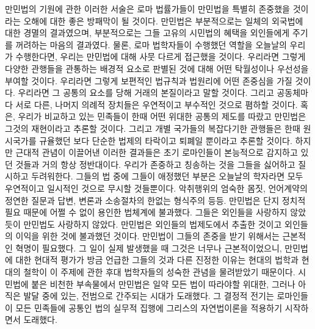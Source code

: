 만민법의 기원에 관한 이러한 서술은
로마 법률가들이 만민법을 특별히 존중했을 것이라는 오해에 대한
좋은 방패막이 될 것이다.
만민법은 부분적으로는 일체의 외국법에 대한 경멸의 결과였으며,
부분적으로는 그들 고유의 시민법의 혜택을 외인들에게 주기를 꺼려하는
마음의 결과였다.
물론, 로마 법학자들이 수행했던 역할을 오늘날의 우리가 수행한다면,
우리는 만민법에 대해 사뭇 다르게 접근했을 것이다.
우리라면 그렇게 다양한 관행들을 관통하는 배경적 요소로 판별된 것에 대해
어떤 탁월성이나 우선성을 부여할 것이다.
우리라면 그렇게 보편적인 법규칙과 법원리에 어떤 존중심을 가질 것이다.
우리라면 그 공통의 요소를 당해 거래의 본질이라고 말할 것이다.
그리고 공동체마다 서로 다른, 나머지 의례적 장치들은
우연적이고 부수적인 것으로 폄하할 것이다.
혹은, 우리가 비교하고 있는 민족들이 한때 어떤 위대한 공통의 제도를
따랐고 만민법은 그것의 재현이라고 추론할 것이다.
그리고 개별 국가들의 복잡다기한 관행들은 한때 원시국가를 규율했던
보다 단순한 법제의 타락이고 퇴폐일 뿐이라고 추론할 것이다.
하지만 근대적 관념이 이끌어낸 이러한 결과들은
초기 로마인들이 본능적으로 감지하고 있던 것들과
거의 항상 정반대이다.
우리가 존중하고 칭송하는 것을 그들을 싫어하고 질시하고 두려워한다.
그들의 법 중에 그들이 애정했던 부분은
오늘날의 학자라면 모두 우연적이고 일시적인 것으로 무시할 것들뿐이다.
악취행위의 엄숙한 몸짓, 언어계약의 정연한 질문과 답변,
변론과 소송절차의 한없는 형식주의 등등.
만민법은 단지 정치적 필요 때문에 어쩔 수 없이 용인한 법체계에 불과했다.
그들은 외인들을 사랑하지 않았듯이 만민법도 사랑하지 않았다.
만민법은 외인들의 법제도에서 추출한 것이고 외인들의 이익을 위한 것에 불과했던
것이다.
만민법이 그들의 존중을 받기 위해서는 근본적인 혁명이 필요했다.
그 일이 실제 발생했을 때 그것은 너무나 근본적이었으니,
만민법에 대한 현대적 평가가 방금 언급한 그들의 것과 다른 진정한 이유는
현대의 법학과 현대의 철학이
이 주제에 관한 후대 법학자들의 성숙한 관념을
물려받았기 때문이다.
시민법에 붙은 비천한 부속물에서
만민법은 일약 모든 법이 따라야할 위대한, 그러나 아직은 발달 중에 있는,
전범으로 간주되는 시대가 도래했다.
그 결정적 전기는
로마인들이
모든 민족들에 공통인 법의 실무적 집행에
그리스의 자연법이론을
적용하기 시작하면서 도래했다.

